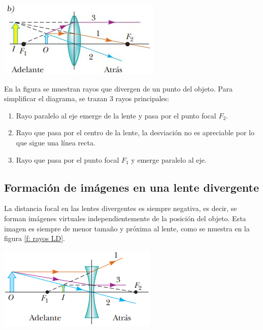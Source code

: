 \documentclass[a4paper,12pt]{article}
\newenvironment{Figure}
  {\par\medskip\noindent\minipage{\linewidth}}
  {\endminipage\par\medskip}
\begin{document}
\begin{multicols*}{2}
        \begin{Figure}
            \centering
            \includegraphics[width=0.7\linewidth]{DiagramaRayosLC2.jpg}
            \label{Diag rayos LC}
        \end{Figure}

       En la figura se muestran rayos que divergen de un punto del objeto. Para simplificar el diagrama, se trazan 3 rayos principales:

        \begin{enumerate}
            \item Rayo paralelo al eje emerge de la lente y pasa por el punto focal $F_{2}$.
            \item Rayo que pasa por el centro de la lente, la desviación no es apreciable por lo que sigue una línea recta.
            \item Rayo que pasa por el punto focal $F_{1}$ y emerge paralelo al eje.
        \end{enumerate}

    \subsection*{Formación de imágenes en una lente divergente}

        La distancia focal en las lentes divergentes es siempre negativa, es decir, se forman imágenes virtuales independientemente de la posición del objeto. Esta imagen es siempre de menor tamaño y próxima al lente, como se muestra en la figura \ref{f: rayos LD}.

        \begin{Figure}
            \centering
            \includegraphics[width=0.9\linewidth]{DiagRayosLD.png}
            \label{f: rayos LD}
        \end{Figure}


\end{multicols*}
\end{document}
